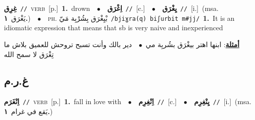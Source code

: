 \documentclass[10pt,a4paper,twoside]{article} %
\begin{document}
\begin{multicols}{2}
{\setlength\topsep{0pt}\textbf{\foreignlanguage{arabic}{غِرِق}}\ {\color{gray}\texttt{//}\color{black}}\ \textsc{verb}\ [p.]\ \textbf{1.}~drown\ \ $\bullet$\ \ \setlength\topsep{0pt}\textbf{\foreignlanguage{arabic}{اِغْرَق}}\ {\color{gray}\texttt{//}\color{black}}\ [c.]\ \ $\bullet$\ \ \setlength\topsep{0pt}\textbf{\foreignlanguage{arabic}{يِغْرَق}}\ {\color{gray}\texttt{//}\color{black}}\ [i.]\ \color{gray}(msa. \foreignlanguage{arabic}{يَغْرَق}~\foreignlanguage{arabic}{\textbf{١.}})\color{black}\ \ $\bullet$\ \ \textsc{ph.} \color{gray} \foreignlanguage{arabic}{بْيِغْرَق بِشُرْبِة مَيّ}\color{black}\ {\color{gray}\texttt{/{\sffamily bjiɣra(q) biʃurbit m\#jj}/}\color{black}}\ \textbf{1.}~It is an idiomatic expression that means that sb is very naive and inexperienced\  \begin{flushright}\color{gray}\foreignlanguage{arabic}{\textbf{\underline{\foreignlanguage{arabic}{أمثلة}}}: ابنها اهتر بيغْرَق بشُربِة مي\ $\bullet$\ \  دير بالك وأنت تسبح تروحش للعميق بلاش ما تِغْرَق لا سمح الله}\end{flushright}\color{black}} \vspace{2mm}

\vspace{-3mm}
\subsection*{\color{blue}\foreignlanguage{arabic}{غ.ر.م}\color{blue}{}} 

{\setlength\topsep{0pt}\textbf{\foreignlanguage{arabic}{اِنْغَرَم}}\ {\color{gray}\texttt{//}\color{black}}\ \textsc{verb}\ [p.]\ \textbf{1.}~fall in love with\ \ $\bullet$\ \ \setlength\topsep{0pt}\textbf{\foreignlanguage{arabic}{اِنْغِرِم}}\ {\color{gray}\texttt{//}\color{black}}\ [c.]\ \ $\bullet$\ \ \setlength\topsep{0pt}\textbf{\foreignlanguage{arabic}{يِنْغِرِم}}\ {\color{gray}\texttt{//}\color{black}}\ [i.]\ \color{gray}(msa. \foreignlanguage{arabic}{يَقع في غرام}~\foreignlanguage{arabic}{\textbf{١.}})\color{black}\ } \vspace{2mm}


\end{multicols}
\end{document}

